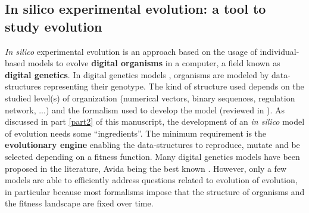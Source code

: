 
\subsection{In silico experimental evolution: a tool to study evolution}
\textit{In silico} experimental evolution \citep{hindre-et-al-2012,mozhayskiy-tagkopoulos-2013,batut-et-al-2013} is an approach based on the usage of individual-based models to evolve \textbf{digital organisms} in a computer, a field known as \textbf{digital genetics}. In digital genetics models \citep{adami-2006}, organisms are modeled by data-structures representing their genotype. The kind of structure used depends on the studied level(s) of organization (numerical vectors, binary sequences, regulation network, ...) and the formalism used to develop the model (reviewed in \citealt{mozhayskiy-tagkopoulos-2013,hindre-et-al-2012}). As discussed in part \ref{part2} of this manuscript, the development of an \textit{in silico} model of evolution needs some ``ingredients''. The minimum requirement is the \textbf{evolutionary engine} enabling the data-structures to reproduce, mutate and be selected depending on a fitness function. Many digital genetics models have been proposed in the literature, Avida being the best known \citep{wilke-et-al-2001,adami-2006}. However, only a few models are able to efficiently address questions related to evolution of evolution, in particular because most formalisms impose that the structure of organisms and the fitness landscape are fixed over time.

